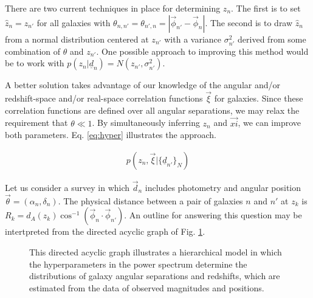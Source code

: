 \documentclass[12pt, onecolumn]{emulateapj}
\newcommand{\textul}{\underline}
\begin{document}
There are two current techniques in place for determining $z_{n}$.  The first is to set $\hat{z}_{n}=z_{n'}$ for all galaxies with $\theta_{n,n'}=\theta_{n',n}=|\vec{\phi}_{n'}-\vec{\phi}_{n}|$.  The second is to draw $\hat{z}_{n}$ from a normal distribution centered at $z_{n'}$ with a variance $\sigma^{2}_{n'}$ derived from some combination of $\theta$ and $z_{n'}$.  One possible approach to improving this method would be to work with $p(z_{n}|\textul{d}_{n})=N(z_{n'},\sigma^{2}_{n'})$.

A better solution takes advantage of our knowledge of the angular and/or redshift-space and/or real-space correlation functions $\vec{\xi}$ for galaxies.  Since these correlation functions are defined over all angular separations, we may relax the requirement that $\theta\ll1$.  By simultaneously inferring $z_{n}$ and $\vec{xi}$, we can improve both parameters.  Eq. \ref{eq:hyper} illustrates the approach.

\begin{align}
\label{eq:hyper}
p(z_{n},\vec{\xi}|\{\textul{d}_{n'}\}_{N})
\end{align}

Let us consider a survey in which $\vec{d}_{n}$ includes photometry and angular position $\vec{\theta}=(\alpha_{n},\delta_{n})$.  The physical distance between a pair of galaxies $n$ and $n'$ at $z_{k}$ is $R_{k}=d_{A}(z_{k})\cos^{-1}(\vec{\phi}_{n}\cdot\vec{\phi}_{n'})$.  An outline for answering this question may be intertpreted from the directed acyclic graph of Fig. \ref{fig:flow}.

\begin{figure}
\label{fig:flow}
\vspace{0.5cm}
\begin{center}
\caption{This directed acyclic graph illustrates a hierarchical model in which the hyperparameters in the power spectrum determine the distributions of galaxy angular separations and redshifts, which are estimated from the data of observed magnitudes and positions.}
\end{center}
\end{figure}
\end{document}
